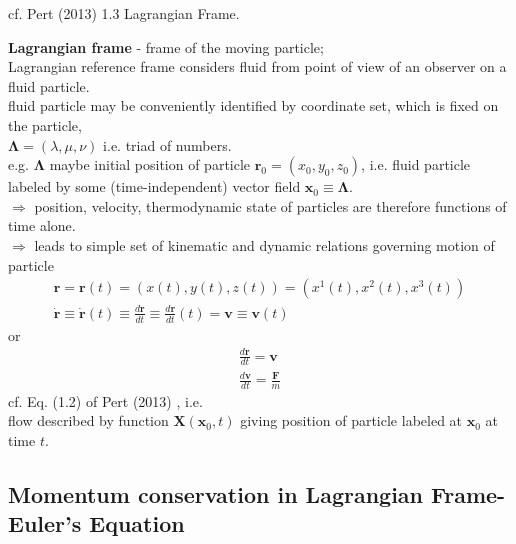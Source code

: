 cf. Pert (2013) \cite{dgdt:Pert2013} 1.3 Lagrangian Frame.

\textbf{Lagrangian frame} - frame of the moving particle; \\
Lagrangian reference frame considers fluid from point of view of an observer on a fluid particle. \\

fluid particle may be conveniently identified by coordinate set, which is fixed on the particle, \\
$\mathbf{\Lambda} = (\lambda, \mu, \nu)$ i.e. triad of numbers. \\
e.g. $\mathbf{\Lambda}$ maybe initial position of particle $\mathbf{r}_0 = (x_0, y_0, z_0)$, i.e. fluid particle labeled by some (time-independent) vector field $\mathbf{x}_0 \equiv \mathbf{\Lambda}$. \\

$\Longrightarrow $ position, velocity, thermodynamic state of particles are therefore functions of time alone. \\
$\Longrightarrow$ leads to simple set of kinematic and dynamic relations governing motion of particle \\
\[
\begin{gathered}
	\mathbf{r} = \mathbf{r}(t) = (x(t), y(t), z(t)) = (x^1(t), x^2(t), x^3(t)) \\ 
	\dot{ \mathbf{r}} \equiv \dot{\mathbf{r}}(t) \equiv \frac{d\mathbf{r}}{dt} \equiv \frac{d\mathbf{r}}{dt} (t) = \mathbf{v} \equiv \mathbf{v}(t)
\end{gathered}
\]
or 
\begin{equation}
\begin{gathered}
\frac{d\mathbf{r}}{dt} = \mathbf{v} \\ 
\frac{d\mathbf{v}}{dt} = \frac{\mathbf{F}}{m}
\end{gathered}
\end{equation}
cf. Eq. (1.2) of Pert (2013) \cite{dgdt:Pert2013}, i.e. \\

flow described by function $\mathbf{X}(\mathbf{x}_0, t)$ giving position of particle labeled at $\mathbf{x}_0$ at time $t$.

\subsection{Momentum conservation in Lagrangian Frame-Euler's Equation}

